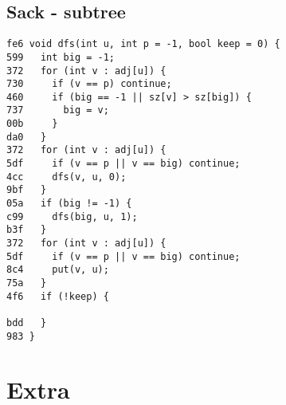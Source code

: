 \documentclass[10pt, a4paper, twoside]{article}
\begin{document}
\subsection{Sack - subtree}
\begin{lstlisting}
fe6 void dfs(int u, int p = -1, bool keep = 0) {
599   int big = -1;
372   for (int v : adj[u]) {
730     if (v == p) continue;
460     if (big == -1 || sz[v] > sz[big]) {
737       big = v;
00b     }
da0   }
372   for (int v : adj[u]) {
5df     if (v == p || v == big) continue;
4cc     dfs(v, u, 0);
9bf   }
05a   if (big != -1) {
c99     dfs(big, u, 1);
b3f   }
372   for (int v : adj[u]) {
5df     if (v == p || v == big) continue;
8c4     put(v, u);
75a   }
4f6   if (!keep) {
        
bdd   }
983 }
\end{lstlisting}

\pagebreak


%
%

\section{Extra}
\end{document}
